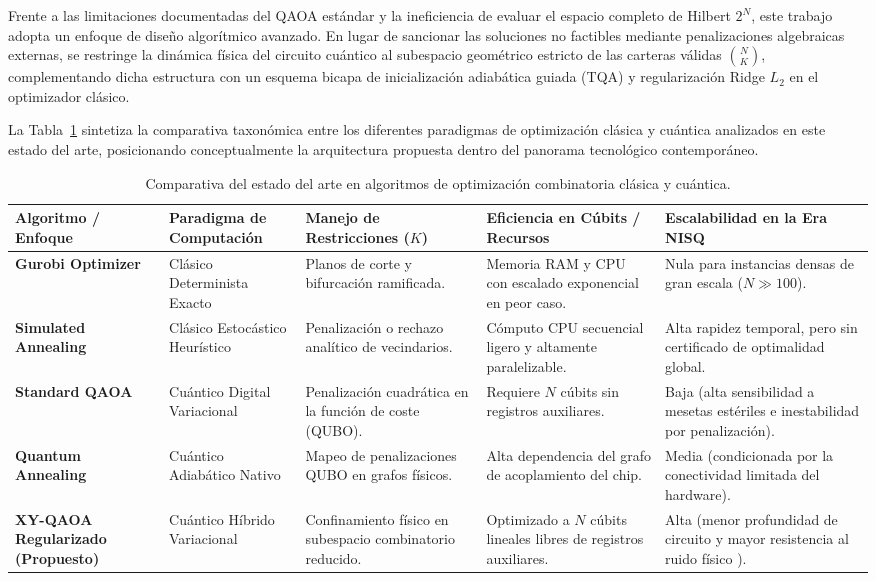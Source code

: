 Frente a las limitaciones documentadas del QAOA estándar y la ineficiencia de evaluar el espacio completo de Hilbert $2^N$, este trabajo adopta un enfoque de diseño algorítmico avanzado. En lugar de sancionar las soluciones no factibles mediante penalizaciones algebraicas externas, se restringe la dinámica física del circuito cuántico al subespacio geométrico estricto de las carteras válidas $\binom{N}{K}$, complementando dicha estructura con un esquema bicapa de inicialización adiabática guiada (TQA) y regularización Ridge $L_2$ en el optimizador clásico.

La Tabla~\ref{tab:estado_arte} sintetiza la comparativa taxonómica entre los diferentes paradigmas de optimización clásica y cuántica analizados en este estado del arte, posicionando conceptualmente la arquitectura propuesta dentro del panorama tecnológico contemporáneo.

\begin{table}[htbp]
    \centering
    \small
    \caption{Comparativa del estado del arte en algoritmos de optimización combinatoria clásica y cuántica.}
    \label{tab:estado_arte}
    \renewcommand{\arraystretch}{1.3}
    \begin{tabular}{p{2.6cm}p{2.4cm}p{2.8cm}p{2.2cm}p{2.7cm}}
        \toprule
        \textbf{Algoritmo / Enfoque} & \textbf{Paradigma de Computación} & \textbf{Manejo de Restricciones ($K$)} & \textbf{Eficiencia en Cúbits / Recursos} & \textbf{Escalabilidad en la Era NISQ} \\
        \midrule
        \textbf{Gurobi Optimizer} \cite{Gurobi2025} & Clásico Determinista Exacto & Planos de corte y bifurcación ramificada. & Memoria RAM y CPU con escalado exponencial en peor caso. & Nula para instancias densas de gran escala ($N \gg 100$). \\
        \addlinespace
        \textbf{Simulated Annealing} & Clásico Estocástico Heurístico & Penalización o rechazo analítico de vecindarios. & Cómputo CPU secuencial ligero y altamente paralelizable. & Alta rapidez temporal, pero sin certificado de optimalidad global. \\
        \addlinespace
        \textbf{Standard QAOA} \cite{Farhi2014} & Cuántico Digital Variacional & Penalización cuadrática en la función de coste (QUBO). & Requiere $N$ cúbits sin registros auxiliares. & Baja (alta sensibilidad a mesetas estériles e inestabilidad por penalización). \\
        \addlinespace
        \textbf{Quantum Annealing} & Cuántico Adiabático Nativo & Mapeo de penalizaciones QUBO en grafos físicos. & Alta dependencia del grafo de acoplamiento del chip. & Media (condicionada por la conectividad limitada del hardware). \\
        \addlinespace
        \textbf{XY-QAOA Regularizado (Propuesto)} & Cuántico Híbrido Variacional & Confinamiento físico en subespacio combinatorio reducido. & Optimizado a $N$ cúbits lineales libres de registros auxiliares. & Alta (menor profundidad de circuito y mayor resistencia al ruido físico \cite{Barkoutsos2020}). \\
        \bottomrule
    \end{tabular}
\end{table}
